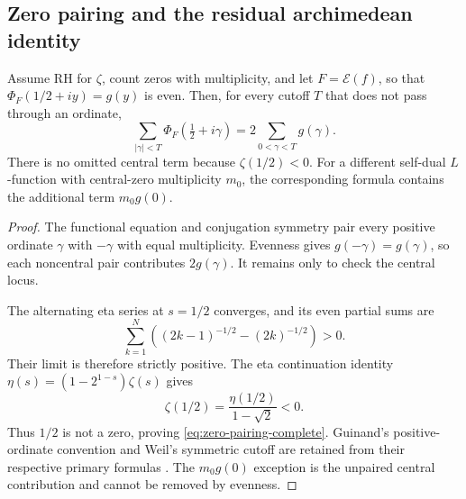 \subsection{Zero pairing and the residual archimedean identity}

\begin{theorem}
\label{thm:zero-pairing-complete}
Assume RH for $\zeta$, count zeros with multiplicity, and let
$F=\mathcal E(f)$, so that
$\Phi_F(1/2+iy)=g(y)$ is even.  Then, for every cutoff $T$ that does not pass
through an ordinate,
\begin{equation}
 \sum_{|\gamma|<T}\Phi_F(\tfrac12+i\gamma)
 =2\sum_{0<\gamma<T}g(\gamma).
 \label{eq:zero-pairing-complete}
\end{equation}
There is no omitted central term because $\zeta(1/2)<0$.
For a different self-dual $L$-function with central-zero multiplicity $m_0$,
the corresponding formula contains the additional term $m_0g(0)$.
\end{theorem}

\begin{proof}
The functional equation and conjugation symmetry pair every positive ordinate
$\gamma$ with $-\gamma$ with equal multiplicity.  Evenness gives
$g(-\gamma)=g(\gamma)$, so each noncentral pair contributes $2g(\gamma)$.
It remains only to check the central locus.

The alternating eta series at $s=1/2$ converges, and its even partial sums are
\[
 \sum_{k=1}^N\left((2k-1)^{-1/2}-(2k)^{-1/2}\right)>0.
\]
Their limit is therefore strictly positive.  The eta continuation identity
$\eta(s)=(1-2^{1-s})\zeta(s)$ gives
\[
 \zeta(1/2)=\frac{\eta(1/2)}{1-\sqrt2}<0.
\]
Thus $1/2$ is not a zero, proving \eqref{eq:zero-pairing-complete}.  Guinand's
positive-ordinate convention and Weil's symmetric cutoff are retained from
their respective primary formulas
\cite[pp.~107--115]{guinand1948}
\cite[Collected Papers II, pp.~57--58]{weil1952}.  The $m_0g(0)$ exception is
the unpaired central contribution and cannot be removed by evenness.
\end{proof}

